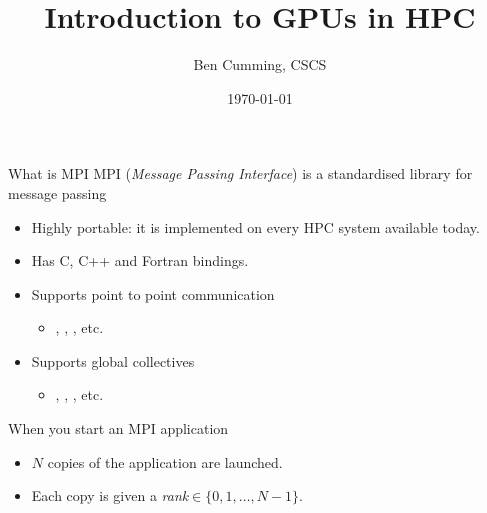 \documentclass[aspectratio=43]{beamer}
\author{Ben Cumming, CSCS}
\title{Introduction to GPUs in HPC}
\subtitle{}
\date{\today}
\begin{document}
\cscstitle


\begin{frame}[fragile]{What is MPI}
    MPI (\emph{Message Passing Interface}) is a standardised library for message passing
    \begin{itemize}
        \item Highly portable: it is implemented on every HPC system available today.
        \item Has C, C++ and Fortran bindings.
        \item Supports point to point communication
        \begin{itemize}
            \item {}, , , etc.
        \end{itemize}
        \item Supports global collectives
        \begin{itemize}
            \item {}, , , etc.
        \end{itemize}
    \end{itemize}
    When you start an MPI application
    \begin{itemize}
        \item $N$ copies of the application are launched.
        \item Each copy is given a \emph{rank}$\in\{0,1,\dots,N-1\}$.
    \end{itemize}
\end{frame}
\end{document}
